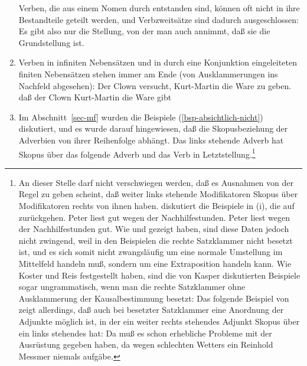 \begin{enumerate}
Verben, die aus einem Nomen durch  entstanden sind, können oft nicht
in ihre Bestandteile geteilt werden, und Verbzweitsätze sind dadurch ausgeschlossen:
\eal
{}
\zl
Es gibt also nur die Stellung, von der man auch annimmt, daß sie die Grundstellung ist.
\item Verben in infiniten Nebensätzen und in durch eine Konjunktion eingeleiteten
finiten Nebensätzen stehen immer am Ende (von Ausklammerungen ins Nachfeld abgesehen):
\eal
\ex Der Clown versucht, Kurt-Martin die Ware zu geben.
\ex daß der Clown Kurt-Martin die Ware gibt
\zl
\item{} Im Abschnitt~\ref{sec-mf} wurden die Beispiele (\ref{bsp-absichtlich-nicht}) diskutiert,
und es wurde darauf hingewiesen, daß die Skopusbeziehung der Adverbien
von ihrer Reihenfolge abhängt. Das links stehende Adverb hat Skopus über das folgende Adverb
und das Verb in Letztstellung.\footnote{%
An dieser Stelle darf nicht verschwiegen werden,
  daß es Ausnahmen von der Regel zu geben scheint, daß weiter links stehende Modifikatoren
  Skopus über Modifikatoren rechts von ihnen haben. \citet*[]{Kasper94a}
  diskutiert die Beispiele in (i), die auf  \citet*[]{BV72} zurückgehen.
\eal
\label{bsp-peter-liest-gut-wegen}
\ex Peter liest gut wegen der Nachhilfestunden.
\ex Peter liest wegen der Nachhilfestunden gut.
\zl
  Wie \citet[Abschnitt~6]{Koster75a} und \citet*[]{Reis80a} gezeigt haben, sind diese Daten jedoch nicht
  zwingend, weil in den Beispielen die rechte Satzklammer nicht besetzt ist, und es sich
  somit nicht zwangsläufig um eine normale Umstellung im Mittelfeld handeln muß, sondern um 
  eine Extraposition handeln kann. Wie Koster und Reis festgestellt haben,
  sind die von Kasper diskutierten Beispiele sogar ungrammatisch,
  wenn man die rechte Satzklammer ohne Ausklammerung der Kausalbestimmung besetzt:
\eal
{}
\zl
  Das folgende Beispiel von \citet[]{Crysmann2004a}
  zeigt allerdings, daß auch bei besetzter Satzklammer eine Anordnung der Adjunkte
  möglich ist, in der ein weiter rechts stehendes Adjunkt Skopus über ein links stehendes hat:
\ea
Da muß es schon erhebliche Probleme mit der Ausrüstung gegeben haben, da wegen schlechten
  Wetters ein Reinhold Messmer niemals aufgäbe.
}
\end{enumerate}
